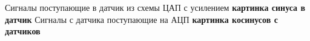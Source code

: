 Сигналы поступающие в датчик из схемы ЦАП с усилением \textbf{картинка синуса в датчик}
Сигналы с датчика поступающие на АЦП \textbf{картинка косинусов с датчиков}






